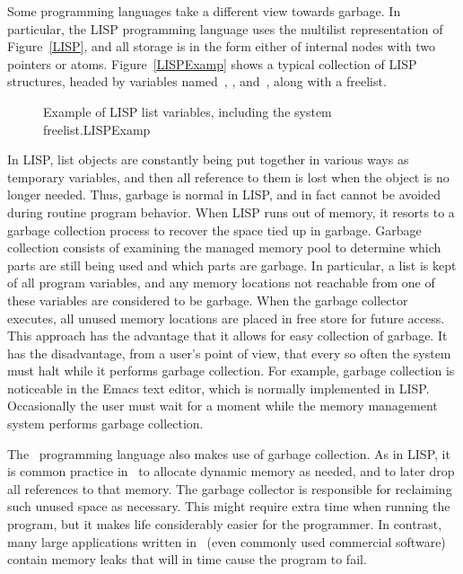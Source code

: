 Some programming languages take a different view towards garbage.
In particular, the LISP programming language uses the multilist
representation of Figure~\ref{LISP}, and all storage is in the form
either of internal nodes with two pointers or atoms.
Figure~\ref{LISPExamp} shows a typical collection of LISP structures,
headed by variables named~, , and~, along with
a freelist.

\begin{figure}
\vspace{-\bigskipamount}\vspace{-\bigskipamount}

{Example of LISP list variables, including the system
freelist.}{LISPExamp}
\smallskip
\end{figure}

In LISP, list objects are constantly being put together in
various ways as temporary variables, and then all reference to them
is lost when the object is no longer needed.
Thus, garbage is normal in LISP, and in fact cannot be
avoided during routine program behavior.
When LISP runs out of memory, it resorts to a garbage collection
process to recover the space tied up in garbage.
Garbage collection consists of examining the managed memory
pool to determine which parts are still being used and which parts
are garbage.
In particular, a list is kept of all program variables, and
any memory locations not reachable from one of these variables are
considered to be garbage.
When the garbage collector executes, all unused memory locations
are placed in free store for future access.
This approach has the advantage that it allows for easy collection of
garbage.
It has the disadvantage, from a user's point of view, that every so
often the system must halt while it performs garbage collection.
For example, garbage collection is noticeable in the Emacs text
editor, which is normally implemented in
LISP.
Occasionally the user must wait for a moment while the memory
management system performs garbage collection.

The \LangJava\ programming language also makes use of garbage collection.
As in LISP, it is common practice in \LangJava\ to allocate dynamic memory
as needed, and to later drop all references to that memory.
The garbage collector is responsible for reclaiming such unused space
as necessary.
This might require extra time when running the program, but it makes
life considerably easier for the programmer.
In contrast, many large applications written in \LangCPP\
(even commonly used commercial software) contain memory leaks that
will in time cause the program to fail.

